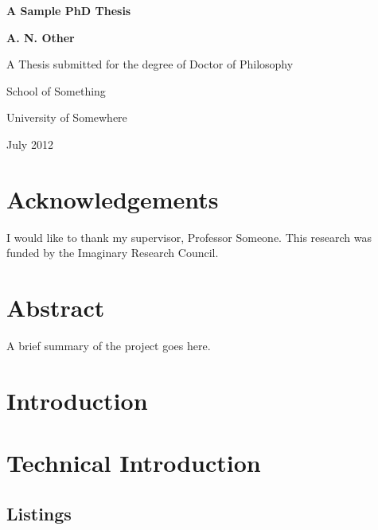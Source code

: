 \documentclass[oneside,12pt]{scrbook}
\theoremstyle{break}
\begin{document}
\begin{titlepage}
\centering
\vspace*{1in}
\begin{Large}\bfseries
A Sample PhD Thesis\par
\end{Large}
\vspace{1.5in}
\begin{large}\bfseries
A. N. Other\par
\end{large}
\vfill
A Thesis submitted for the degree of Doctor of Philosophy
\par
\vspace{0.5in}
School of Something
\par
University of Somewhere
\par
\vspace{0.5in}
July 2012
\par
\end{titlepage}

\doublespacing

\frontmatter
\tableofcontents
\listoffigures
\listoftables
\lstlistoflistings

\chapter{Acknowledgements}

I would like to thank my supervisor, Professor Someone. This
research was funded by the Imaginary Research Council.

\chapter{Abstract}

A brief summary of the project goes here.

\mainmatter

\chapter{Introduction}
\label{ch:intro}


\chapter{Technical Introduction}
\label{ch:techintro}

\section{Listings}
\end{document}
